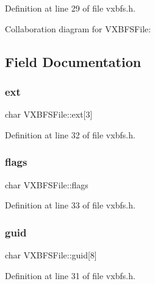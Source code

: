 Definition at line 29 of file vxbfs.\+h.



Collaboration diagram for V\+X\+B\+F\+S\+File\+:


\subsection{Field Documentation}
\mbox{\label{a00332_ad030f5719e51b0b41b7cb6047f4110b2_ad030f5719e51b0b41b7cb6047f4110b2}} 
\subsubsection{\texorpdfstring{ext}{ext}}
{\footnotesize\ttfamily char V\+X\+B\+F\+S\+File\+::ext\mbox{[}3\mbox{]}}



Definition at line 32 of file vxbfs.\+h.

\mbox{\label{a00332_a8fc3bc64d7f2330f923507d2430bdde4_a8fc3bc64d7f2330f923507d2430bdde4}} 
\subsubsection{\texorpdfstring{flags}{flags}}
{\footnotesize\ttfamily char V\+X\+B\+F\+S\+File\+::flags}



Definition at line 33 of file vxbfs.\+h.

\mbox{\label{a00332_a03b954de114d8e01bb783ddef964e8ca_a03b954de114d8e01bb783ddef964e8ca}} 
\subsubsection{\texorpdfstring{guid}{guid}}
{\footnotesize\ttfamily char V\+X\+B\+F\+S\+File\+::guid\mbox{[}8\mbox{]}}



Definition at line 31 of file vxbfs.\+h.

